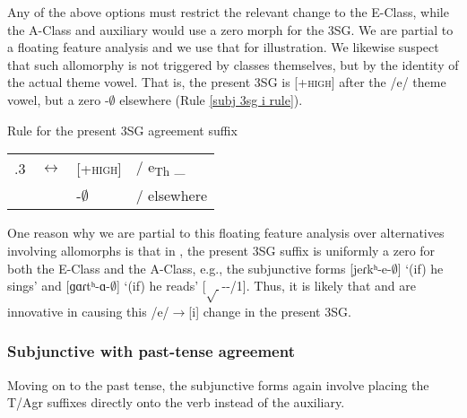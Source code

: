 	
	
	Any of the above options must restrict the relevant change to the E-Class, while the A-Class and auxiliary would use a zero morph for the 3SG. We are partial to a floating feature analysis \citep[cf.][]{Akinlabi-2011-FeaturalAffix} and we use that for illustration. We likewise suspect that such allomorphy is not triggered by classes themselves, but by the identity of the actual theme vowel. That is, the present 3SG is [\textsc{+high}] after the /{e}/ theme vowel, but a zero -$\emptyset$ elsewhere (Rule \ref{subj 3sg i rule}).
	
	\begin{newruleblock}
		{Rule for the present 3SG agreement suffix}%
		
		\begin{center}
			\begin{tabular}{llll}
				{\prs}.3{\sg} & $\leftrightarrow$ & [\textsc{+high}] & / {e}\textsubscript{Th} \_ \\
				& & -$\emptyset$ & / elsewhere
				
			\end{tabular}
		\end{center} 
	\end{newruleblock}
	
	
	One reason why we are partial to this floating feature analysis over alternatives involving allomorphs is that in {\swaSWA}, the present 3SG suffix is uniformly a zero for both the E-Class and the A-Class, e.g., the subjunctive forms [{{jeɾkʰ-e-$\emptyset$}}] `(if) he sings' and [{{ɡɑɾtʰ-ɑ-$\emptyset$}}] `(if) he reads' [$\sqrt{~}$-{\thgloss}-{\prs}/1{\sg}]. Thus, it is likely that {\seaSE} and {\iaIA} are innovative in causing this /{e}/$\rightarrow$[{i}] change in the present 3SG.
	
	\subsubsection{Subjunctive with past-tense agreement}\label{section:verb:synthesis:subj:pst}\largerpage
	
	
	
	Moving on to the past tense, the subjunctive forms again involve placing the T/Agr suffixes directly onto the verb instead of the auxiliary. 
	
